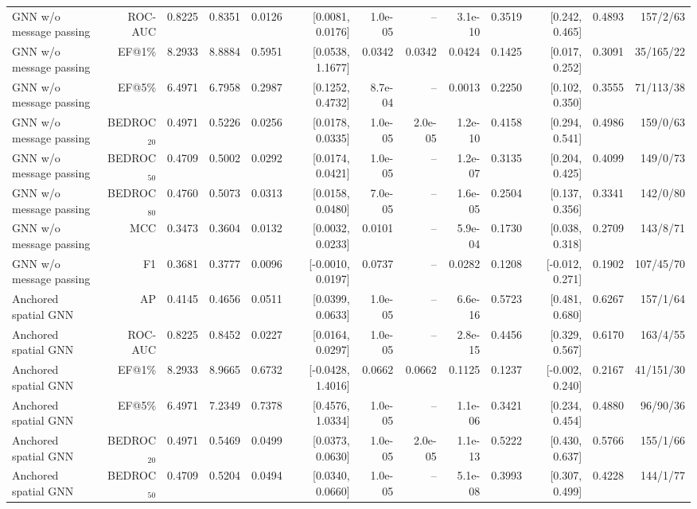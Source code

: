 \begin{table}[t]
\begin{tabular}{lrrrrrrrrrrrr}
GNN w/o message passing & ROC-AUC & 0.8225 & 0.8351 & 0.0126 & [0.0081, 0.0176] & 1.0e-05 & -- & 3.1e-10 & 0.3519 & [0.242, 0.465] & 0.4893 & 157/2/63 \\
GNN w/o message passing & EF@1\% & 8.2933 & 8.8884 & 0.5951 & [0.0538, 1.1677] & 0.0342 & 0.0342 & 0.0424 & 0.1425 & [0.017, 0.252] & 0.3091 & 35/165/22 \\
GNN w/o message passing & EF@5\% & 6.4971 & 6.7958 & 0.2987 & [0.1252, 0.4732] & 8.7e-04 & -- & 0.0013 & 0.2250 & [0.102, 0.350] & 0.3555 & 71/113/38 \\
GNN w/o message passing & BEDROC$_{20}$ & 0.4971 & 0.5226 & 0.0256 & [0.0178, 0.0335] & 1.0e-05 & 2.0e-05 & 1.2e-10 & 0.4158 & [0.294, 0.541] & 0.4986 & 159/0/63 \\
GNN w/o message passing & BEDROC$_{50}$ & 0.4709 & 0.5002 & 0.0292 & [0.0174, 0.0421] & 1.0e-05 & -- & 1.2e-07 & 0.3135 & [0.204, 0.425] & 0.4099 & 149/0/73 \\
GNN w/o message passing & BEDROC$_{80}$ & 0.4760 & 0.5073 & 0.0313 & [0.0158, 0.0480] & 7.0e-05 & -- & 1.6e-05 & 0.2504 & [0.137, 0.356] & 0.3341 & 142/0/80 \\
GNN w/o message passing & MCC & 0.3473 & 0.3604 & 0.0132 & [0.0032, 0.0233] & 0.0101 & -- & 5.9e-04 & 0.1730 & [0.038, 0.318] & 0.2709 & 143/8/71 \\
GNN w/o message passing & F1 & 0.3681 & 0.3777 & 0.0096 & [-0.0010, 0.0197] & 0.0737 & -- & 0.0282 & 0.1208 & [-0.012, 0.271] & 0.1902 & 107/45/70 \\
Anchored spatial GNN & AP & 0.4145 & 0.4656 & 0.0511 & [0.0399, 0.0633] & 1.0e-05 & -- & 6.6e-16 & 0.5723 & [0.481, 0.680] & 0.6267 & 157/1/64 \\
Anchored spatial GNN & ROC-AUC & 0.8225 & 0.8452 & 0.0227 & [0.0164, 0.0297] & 1.0e-05 & -- & 2.8e-15 & 0.4456 & [0.329, 0.567] & 0.6170 & 163/4/55 \\
Anchored spatial GNN & EF@1\% & 8.2933 & 8.9665 & 0.6732 & [-0.0428, 1.4016] & 0.0662 & 0.0662 & 0.1125 & 0.1237 & [-0.002, 0.240] & 0.2167 & 41/151/30 \\
Anchored spatial GNN & EF@5\% & 6.4971 & 7.2349 & 0.7378 & [0.4576, 1.0334] & 1.0e-05 & -- & 1.1e-06 & 0.3421 & [0.234, 0.454] & 0.4880 & 96/90/36 \\
Anchored spatial GNN & BEDROC$_{20}$ & 0.4971 & 0.5469 & 0.0499 & [0.0373, 0.0630] & 1.0e-05 & 2.0e-05 & 1.1e-13 & 0.5222 & [0.430, 0.637] & 0.5766 & 155/1/66 \\
Anchored spatial GNN & BEDROC$_{50}$ & 0.4709 & 0.5204 & 0.0494 & [0.0340, 0.0660] & 1.0e-05 & -- & 5.1e-08 & 0.3993 & [0.307, 0.499] & 0.4228 & 144/1/77 \\

\end{tabular}
\end{table}
